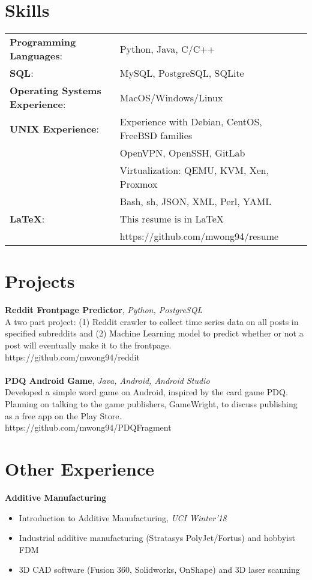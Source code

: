 \documentclass[line,margin]{res}
\begin{document}
\begin{resume}
	\section{Skills}
    	\begin{tabular}{@{}ll}
    		\textbf{Programming Languages}: & Python, Java, C/C++ \\
    		\textbf{SQL}: & MySQL, PostgreSQL, SQLite \\
    		\textbf{Operating Systems Experience}: & MacOS/Windows/Linux \\
    		\textbf{UNIX Experience}: & Experience with Debian, CentOS, FreeBSD families \\
    		                          & OpenVPN, OpenSSH, GitLab \\
    		                          & Virtualization: QEMU, KVM, Xen, Proxmox \\
    		                          & Bash, sh, JSON, XML, Perl, YAML \\
    		\textbf{LaTeX}: & This resume is in LaTeX \\
    		                & https://github.com/mwong94/resume \\
    	\end{tabular}
	
	\section{Projects}
    	\textbf{Reddit Frontpage Predictor}, {\sl Python, PostgreSQL} \\
    	A two part project: (1) Reddit crawler to collect time series data on all posts in specified subreddits and (2) Machine Learning model to predict whether or not a post will eventually make it to the frontpage. \\
    	https://github.com/mwong94/reddit \\\\
    	\textbf{PDQ Android Game}, {\sl Java, Android, Android Studio} \\
    	Developed a simple word game on Android, inspired by the card game PDQ. Planning on talking to the game publishers, GameWright, to discuss publishing as a free app on the Play Store. \\
    	https://github.com/mwong94/PDQFragment
    	
    \section{Other Experience}
    	\textbf{Additive Manufacturing} \\
    	\begin{itemize} \itemsep 3pt
        	\item Introduction to Additive Manufacturing, {\sl UCI Winter'18}
        	\item Industrial additive manufacturing (Stratasys PolyJet/Fortus) and hobbyist FDM
        	\item 3D CAD software (Fusion 360, Solidworks, OnShape) and 3D laser scanning
    	\end{itemize}
    	\textbf{} \\

\end{resume}
\end{document}
